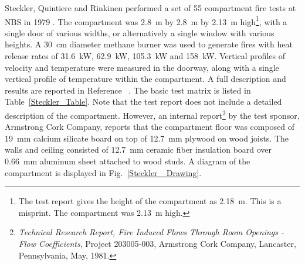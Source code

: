 Steckler, Quintiere and Rinkinen performed a set of 55 compartment fire tests at NBS in 1979 \cite{Steckler:1982}. The compartment was 2.8~m by 2.8~m by 2.13~m high\footnote{The test report
gives the height of the compartment as 2.18~m. This is a misprint. The compartment was 2.13~m high.}, with a single door of
various widths, or alternatively a single window with various heights. A 30~cm diameter methane burner was used to generate fires with heat release rates of
31.6~kW, 62.9~kW, 105.3~kW and 158~kW. Vertical profiles of velocity and temperature were measured in the doorway, along with a single vertical profile of temperature
within the compartment.
A full description and results are reported in Reference~ \cite{Steckler:1982}. The basic test matrix is listed in Table~\ref{Steckler_Table}. Note that the
test report does not include a detailed description of the compartment. However, an internal report\footnote{ {\em Technical Research Report, Fire Induced Flows
Through Room Openings - Flow Coefficients}, Project 203005-003, Armstrong Cork Company, Lancaster, Pennsylvania, May, 1981.} by the test sponsor, Armstrong Cork Company,
reports that the compartment floor was composed of 19~mm calcium silicate board on top of 12.7~mm plywood on wood joists. The walls and ceiling consisted of
12.7~mm ceramic fiber insulation board over 0.66~mm aluminum sheet attached to wood studs. A diagram of the compartment is displayed in Fig.~\ref{Steckler_ Drawing}.

